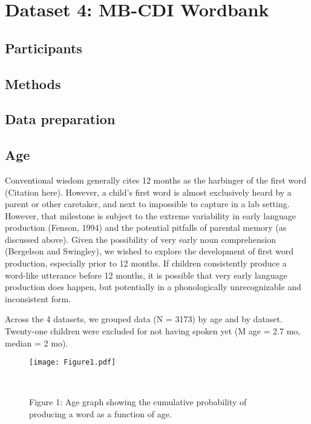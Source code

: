 \documentclass[10pt,letterpaper]{article}
\begin{document}
\section{Dataset 4: MB-CDI Wordbank}

\subsection{Participants}

\subsection{Methods}

\subsection{Data preparation}

\subsection{Age} 
Conventional wisdom generally cites 12 months as the harbinger of the first word (Citation here). However, a child's first word is almost exclusively heard by a parent or other caretaker, and next to impossible to capture in a lab setting. However, that milestone is subject to the extreme variability in early language production (Fenson, 1994) and the potential pitfalls of parental memory (as discussed above). Given the possibility of very early noun comprehension (Bergelson and Swingley), we wished to explore the development of first word production, especially prior to 12 months. If children consistently produce a word-like utterance before 12 months, it is possible that very early language production does happen, but potentially in a phonologically unrecognizable and inconsistent form. \par
Across the 4 datasets, we grouped data (N = 3173) by age and by dataset. Twenty-one children were excluded for not having spoken yet (M age  = 2.7 mo, median = 2 mo). 

\begin{figure}[t]
\begin{center}
\texttt{[image: Figure1.pdf]}
\end{center}
\caption{Figure 1: Age graph showing the cumulative probability of producing a word as a function of age.}\
\end{figure}
\end{document}
